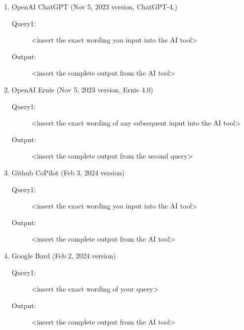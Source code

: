 \documentclass{mcmthesis}
\begin{document}
\begin{enumerate}
\item OpenAI ChatGPT (Nov 5, 2023 version, ChatGPT-4,) 
\begin{description}
\item[Query1:] <insert the exact wording you input into the AI tool> 
\item[Output:] <insert the complete output from the AI tool>
\end{description}
\item OpenAI Ernie (Nov 5, 2023 version, Ernie 4.0) 
\begin{description}
\item[Query1:] <insert the exact wording of any subsequent input into the AI tool> 
\item[Output:] <insert the complete output from the second query>
\end{description}
\item Github CoPilot (Feb 3, 2024 version) 
\begin{description}
\item[Query1:] <insert the exact wording you input into the AI tool> 
\item[Output:] <insert the complete output from the AI tool>
\end{description}
\item Google Bard (Feb 2, 2024 version) 
\begin{description}
\item[Query1:] <insert the exact wording of your query> 
\item[Output:] <insert the complete output from the AI tool>
\end{description}
\end{enumerate}

\clearpage
\setcounter{page}{\value{lastpage}}
\end{document}
